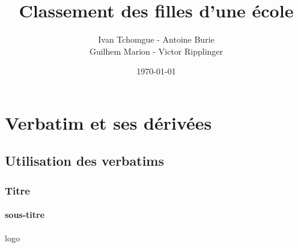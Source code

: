 \documentclass[t, usepdftitle=false]{beamer}%
\title[Projet J2EE]{Classement des filles d'une école} %
\author{Ivan Tchomgue - Antoine Burie\\ Guilhem Marion - Victor Ripplinger} %
\institute{Enseeiht} %
\date{\today} %
\begin{document}


\begin{frame}
    \titlepage
\end{frame}



\section{Verbatim et ses dérivées}	%
\subsection{Utilisation des verbatims} %
\begin{frame}[fragile, label=frame1] %
\frametitle{Titre} %
\framesubtitle{sous-titre} %
\insertlogo logo %

\end{frame}
\end{document}
